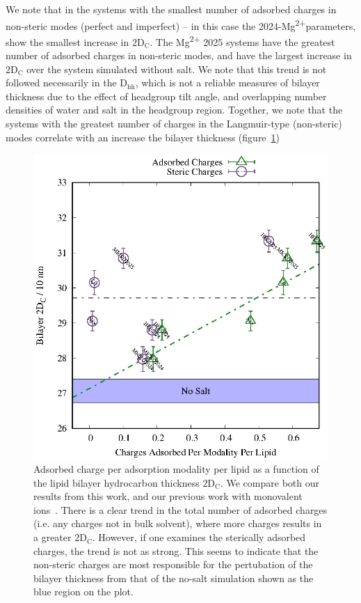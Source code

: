 \documentclass[journal=langd5,manuscript=article]{achemso}
\newcommand{\mg}{Mg\textsuperscript{2+}}
\newcommand{\dhh}{$\text{D}_\text{hh}$}
\newcommand{\dc}{$\text{2D}_\text{C}$}
\begin{document}
We note that in the systems with the smallest number of adsorbed charges in non-steric modes (perfect and imperfect) -- in this case the 2024-\mg parameters, show 
the smallest increase in \dc{}. The \mg{ 2025} systems have the greatest number of adsorbed charges in non-steric modes, 
and have the largest increase in \dc{} over the system simulated without salt. We note that
this trend is not followed necessarily in the \dhh{}, which is not a reliable measures of bilayer thickness due to the effect of headgroup tilt angle, and overlapping number densities of water
and salt in the headgroup region.
Together, we note that the systems with the greatest number of charges in the Langmuir-type (non-steric) modes correlate with an increase the 
bilayer thickness (figure~\ref{fig:chargeperlipid})
\begin{figure}[h!]
    \caption{Adsorbed charge per adsorption modality per lipid as a function of the lipid bilayer hydrocarbon thickness \dc{}. We compare both our results from this work, and our previous work with monovalent
        ions~\cite{saunders:2024}. There is a clear trend in the total number of adsorbed
        charges (i.e. any charges not in bulk solvent), where more charges results in a greater \dc{}. However, if one examines the sterically adsorbed charges, the trend is not as strong. This seems to indicate
    that the non-steric charges are most responsible for the pertubation of the bilayer thickness from that of the no-salt simulation shown as the blue region on the plot.}
    \label{fig:chargeperlipid}
    \includegraphics[height=0.5\textheight]{figures/Figure_6.eps}
\end{figure}
\end{document}
